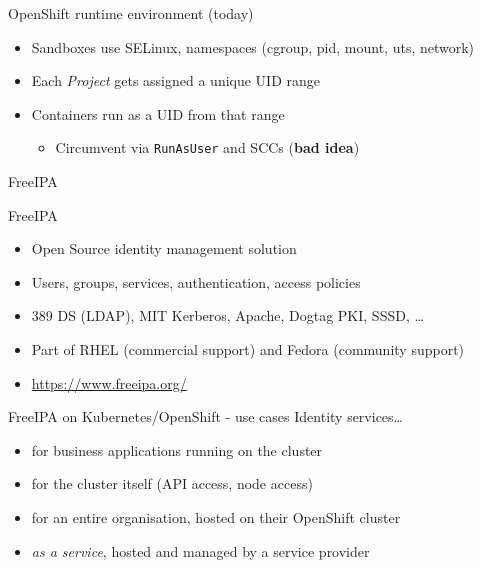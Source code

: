 \documentclass[ignorenonframetext,aspectratio=169,12pt]{beamer}
\begin{document}
\begin{frame}{OpenShift runtime environment (today)}
\protect\hypertarget{openshift-runtime-today}{}
\begin{itemize}
\item Sandboxes use SELinux, namespaces (cgroup, pid, mount, uts, network)
\item Each {\em Project} gets assigned a unique UID range
\item Containers run as a UID from that range
    \begin{itemize}
    \item Circumvent via {\tt RunAsUser} and SCCs ({\bf bad idea})
    \end{itemize}
\end{itemize}
\end{frame}


\begin{frame}[plain]
\centering
\huge FreeIPA
\end{frame}


\begin{frame}{FreeIPA}
\protect\hypertarget{freeipa-intro}{}

\begin{itemize}
\item Open Source identity management solution
\item Users, groups, services, authentication, access policies
\item 389 DS (LDAP), MIT Kerberos, Apache, Dogtag PKI, SSSD, \ldots{}
\item Part of RHEL (commercial support) and Fedora (community support)
\item \url{https://www.freeipa.org/}
\end{itemize}

\end{frame}


\begin{frame}{FreeIPA on Kubernetes/OpenShift - use cases}
\protect\hypertarget{freeipa-openshift-use-cases}{}
Identity services\ldots{}
\begin{itemize}
\item for business applications running on the cluster
\item for the cluster itself (API access, node access)
\item for an entire organisation, hosted on their OpenShift cluster
\item {\em as a service}, hosted and managed by a service provider
\end{itemize}
\end{frame}
\end{document}
